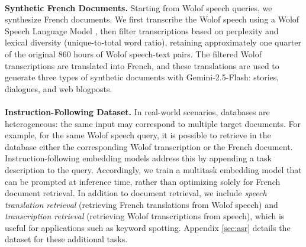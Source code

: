 \documentclass[11pt]{article}
\newcommand{\myparagraph}[1]{\noindent\textbf{#1}}
\begin{document}
\\
\myparagraph{Synthetic French Documents.} Starting from Wolof speech queries, we synthesize French documents. We first transcribe the Wolof speech using a Wolof Speech Language Model \citep{sy2025speechlanguagemodelsunderrepresented}, then filter transcriptions based on perplexity and lexical diversity (unique-to-total word ratio), retaining approximately one quarter of the original 860 hours of Wolof speech-text pairs. The filtered Wolof transcriptions are translated into French, and these translations are used to generate three types of synthetic documents with Gemini-2.5-Flash: stories, dialogues, and web blogposts.
\\
\\
\myparagraph{Instruction-Following Dataset.} In real-world scenarios, databases are heterogeneous: the same input may correspond to multiple target documents. For example, for the same Wolof speech query, it is possible to retrieve in the database either the corresponding Wolof transcription or the French document. Instruction-following embedding models \cite{peng-etal-2024-answer} address this by appending a task description to the query. Accordingly, we train a multitask embedding model that can be prompted at inference time, rather than optimizing solely for French document retrieval. In addition to document retrieval, we include \textit{speech translation retrieval} (retrieving French translations from Wolof speech) and \textit{transcription retrieval} (retrieving Wolof transcriptions from speech), which is useful for applications such as keyword spotting. Appendix \ref{sec:asr} details the dataset for these additional tasks.
\end{document}
